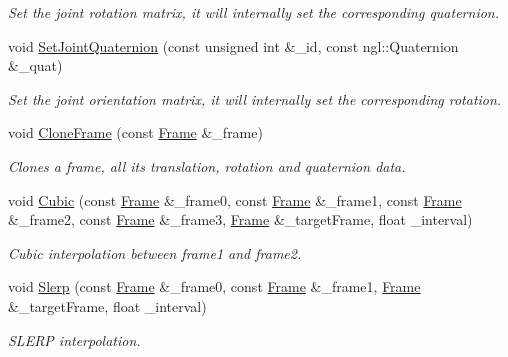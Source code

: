 \begin{DoxyCompactItemize}
\begin{DoxyCompactList}\small\item\em Set the joint rotation matrix, it will internally set the corresponding quaternion. \end{DoxyCompactList}\item 
void \hyperlink{class_frame_a5e20fd259d5db73e524f020020e62fca}{Set\+Joint\+Quaternion} (const unsigned int \&\+\_\+id, const ngl\+::\+Quaternion \&\+\_\+quat)
\begin{DoxyCompactList}\small\item\em Set the joint orientation matrix, it will internally set the corresponding rotation. \end{DoxyCompactList}\item 
void \hyperlink{class_frame_a64c89339d07e5cdbadbe20fe3a9ef3ef}{Clone\+Frame} (const \hyperlink{class_frame}{Frame} \&\+\_\+frame)
\begin{DoxyCompactList}\small\item\em Clones a frame, all its translation, rotation and quaternion data. \end{DoxyCompactList}\item 
void \hyperlink{class_frame_aed2ecc0e807e4e08bc5884d09f657374}{Cubic} (const \hyperlink{class_frame}{Frame} \&\+\_\+frame0, const \hyperlink{class_frame}{Frame} \&\+\_\+frame1, const \hyperlink{class_frame}{Frame} \&\+\_\+frame2, const \hyperlink{class_frame}{Frame} \&\+\_\+frame3, \hyperlink{class_frame}{Frame} \&\+\_\+target\+Frame, float \+\_\+interval)
\begin{DoxyCompactList}\small\item\em Cubic interpolation between frame1 and frame2. \end{DoxyCompactList}\item 
void \hyperlink{class_frame_a5f579560df984da9c564062440324fa4}{Slerp} (const \hyperlink{class_frame}{Frame} \&\+\_\+frame0, const \hyperlink{class_frame}{Frame} \&\+\_\+frame1, \hyperlink{class_frame}{Frame} \&\+\_\+target\+Frame, float \+\_\+interval)
\begin{DoxyCompactList}\small\item\em S\+L\+E\+RP interpolation. \end{DoxyCompactList}\end{DoxyCompactItemize}
